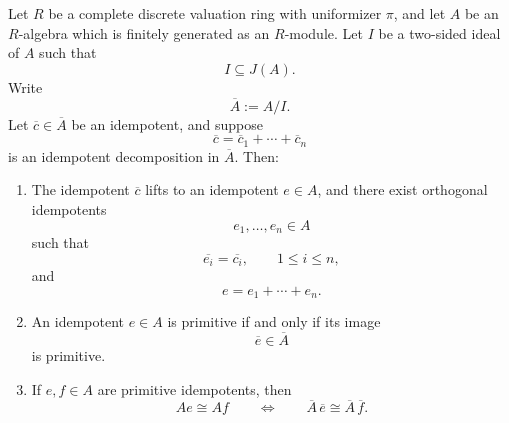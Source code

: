 \begin{theorem}
    Let \(R\) be a complete discrete valuation ring with uniformizer \(\pi\), and let
    \(A\) be an \(R\)-algebra which is finitely generated as an \(R\)-module. Let
    \(I\) be a two-sided ideal of \(A\) such that
    \[
        I\subseteq J(A).
    \]
    Write
    \[
        \overline{A}:=A/I.
    \]
    Let \(\overline{c}\in \overline{A}\) be an idempotent, and suppose
    \[
        \overline{c}
        =
        \overline{c}_1+\cdots+\overline{c}_n
    \]
    is an idempotent decomposition in \(\overline{A}\). Then:
    \begin{enumerate}
        \item The idempotent \(\overline{c}\) lifts to an idempotent \(e\in A\), and
        there exist orthogonal idempotents
        \[
            e_1,\dots,e_n\in A
        \]
        such that
        \[
            \overline{e_i}=\overline{c_i},
            \qquad 1\leq i\leq n,
        \]
        and
        \[
            e=e_1+\cdots+e_n.
        \]

        \item An idempotent \(e\in A\) is primitive if and only if its image
        \[
            \overline{e}\in \overline{A}
        \]
        is primitive.

        \item If \(e,f\in A\) are primitive idempotents, then
        \[
            Ae\cong Af
            \qquad\Longleftrightarrow\qquad
            \overline{A}\,\overline{e}\cong \overline{A}\,\overline{f}.
        \]
    \end{enumerate}
\end{theorem}

